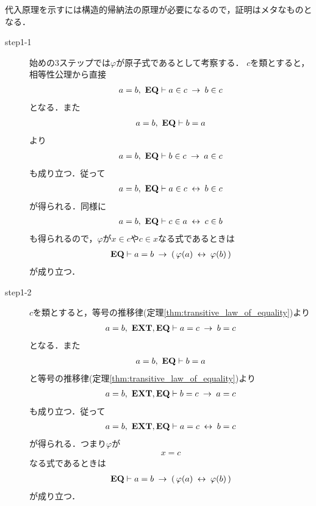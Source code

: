 	代入原理を示すには構造的帰納法の原理が必要になるので，証明はメタなものとなる．
	
	\begin{sketch}\mbox{}
		\begin{description}
			\item[step1-1]
				始めの$3$ステップでは$\varphi$が原子式であるとして考察する．
				$c$を類とすると，相等性公理から直接
				\begin{align}
					a = b,\ \mbox{{\bf EQ}} \vdash a \in c \hspace{0.25em}\rightarrow\hspace{0.25em} b \in c
				\end{align}
				となる．また
				\begin{align}
					a = b,\ \mbox{{\bf EQ}} \vdash b = a
				\end{align}
				より
				\begin{align}
					a = b,\ \mbox{{\bf EQ}} \vdash b \in c \hspace{0.25em}\rightarrow\hspace{0.25em} a \in c
				\end{align}
				も成り立つ．従って
				\begin{align}
					a = b,\ \mbox{{\bf EQ}} \vdash a \in c \hspace{0.25em}\leftrightarrow\hspace{0.25em} b \in c
				\end{align}
				が得られる．同様に
				\begin{align}
					a = b,\ \mbox{{\bf EQ}} \vdash c \in a \hspace{0.25em}\leftrightarrow\hspace{0.25em} c \in b
				\end{align}
				も得られるので，$\varphi$が$x \in c$や$c \in x$なる式であるときは
				\begin{align}
					\mbox{{\bf EQ}} \vdash a = b \hspace{0.25em}\rightarrow\hspace{0.25em} (\, \varphi(a) \hspace{0.25em}\leftrightarrow\hspace{0.25em} \varphi(b)\, )
				\end{align}
				が成り立つ．
			
			\item[step1-2]
				$c$を類とすると，等号の推移律(定理\ref{thm:transitive_law_of_equality})より
				\begin{align}
					a = b,\ \mbox{{\bf EXT}},\mbox{{\bf EQ}} \vdash a = c \hspace{0.25em}\rightarrow\hspace{0.25em} b = c
				\end{align}
				となる．また
				\begin{align}
					a = b,\ \mbox{{\bf EQ}} \vdash b = a
				\end{align}
				と等号の推移律(定理\ref{thm:transitive_law_of_equality})より
				\begin{align}
					a = b,\ \mbox{{\bf EXT}},\mbox{{\bf EQ}} \vdash b = c \hspace{0.25em}\rightarrow\hspace{0.25em} a = c
				\end{align}
				も成り立つ．従って
				\begin{align}
					a = b,\ \mbox{{\bf EXT}},\mbox{{\bf EQ}} \vdash a = c \hspace{0.25em}\leftrightarrow\hspace{0.25em} b = c
				\end{align}
				が得られる．つまり$\varphi$が
				\begin{align}
					x = c
				\end{align}
				なる式であるときは
				\begin{align}
					\mbox{{\bf EQ}} \vdash a = b \hspace{0.25em}\rightarrow\hspace{0.25em} (\, \varphi(a) \hspace{0.25em}\leftrightarrow\hspace{0.25em} \varphi(b)\, )
				\end{align}
				が成り立つ．
				

\end{description}
\end{sketch}
